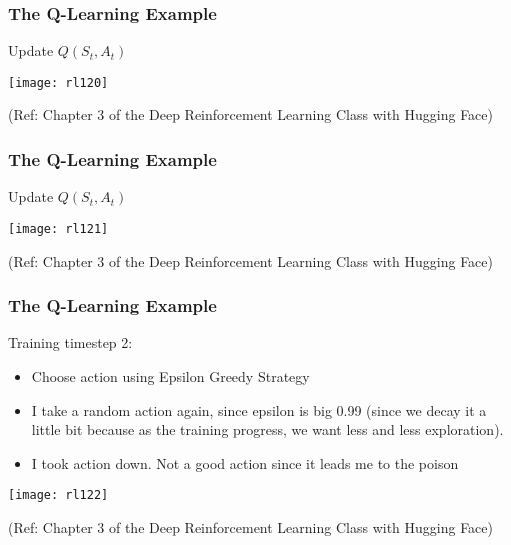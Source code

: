 \begin{frame}[fragile]\frametitle{The Q-Learning Example}

Update $Q(S_t, A_t)$

\begin{center}
\texttt{[image: rl120]}
\end{center}


{\tiny (Ref: Chapter 3 of the Deep Reinforcement Learning Class with Hugging Face)}

\end{frame}



\begin{frame}[fragile]\frametitle{The Q-Learning Example}

Update $Q(S_t, A_t)$

\begin{center}
\texttt{[image: rl121]}
\end{center}


{\tiny (Ref: Chapter 3 of the Deep Reinforcement Learning Class with Hugging Face)}

\end{frame}



\begin{frame}[fragile]\frametitle{The Q-Learning Example}

Training timestep 2: 

\begin{itemize}
\item Choose action using Epsilon Greedy Strategy
\item I take a random action again, since epsilon is big 0.99 (since we decay it a little bit because as the training progress, we want less and less exploration).
\item I took action down. Not a good action since it leads me to the poison
\end{itemize}

\begin{center}
\texttt{[image: rl122]}

\end{center}


{\tiny (Ref: Chapter 3 of the Deep Reinforcement Learning Class with Hugging Face)}

\end{frame}

